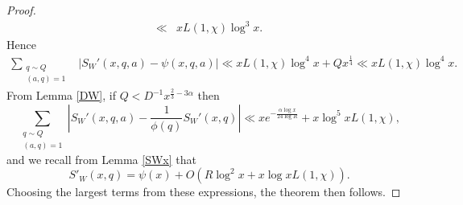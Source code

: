 \documentclass{amsart}
\begin{document}
\begin{proof}
\begin{align*}
\ll &xL(1,\chi)\log^{3} x.
\end{align*}
Hence
\begin{align*}
\sum_{\substack{q\sim Q  \\ (a,q)=1}}&\left|S_W'(x,q,a)-\psi(x,q,a)\right|\ll xL(1,\chi)\log^4 x+Qx^\frac 14\ll xL(1,\chi)\log^4 x.
\end{align*}
From Lemma \ref{DW}, if $Q<D^{-1}x^{\frac 23-3\alpha}$ then
$$\sum_{\substack{q\sim Q  \\ (a,q)=1}}\left|S_W'(x,q,a)-\frac{1}{\phi(q)}S_W'(x,q)\right|\ll xe^{-\frac{\alpha\log x}{24\log R}}+x\log^5 xL(1,\chi),$$
and we recall from Lemma \ref{SWx} that
$$S'_W(x,q)=\psi(x)+O\left(R\log^2 x+x\log xL(1,\chi)\right).$$
Choosing the largest terms from these expressions, the theorem then follows.
\end{proof}
\end{document}
